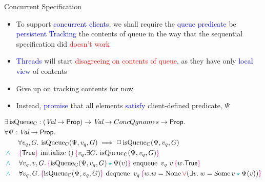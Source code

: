 \documentclass[9pt,xcolor={dvipsnames}]{beamer}
\newcommand{\initialise}{\operatorname{initialize}}
\newcommand{\enqueue}{\operatorname{enqueue}}
\newcommand{\dequeue}{\operatorname{dequeue}}
\newcommand{\isqueueconc}{\operatorname{isQueue_{C}}}
\newcommand{\ConcQgnames}{ConcQgnames}
\newcommand{\vq}{v_q}
\newcommand{\nodeval}{\valB}
\newcommand{\absvalue}{\val}
\newcommand{\Qg}{G}
\newcommand{\concspecinitHTGen}[3]{\hoare{\TRUE}{\initialise \ \TT}{#2 . \Exists #3. \isqueueconc(#1, #2, #3)}}
\newcommand{\concspecinitGen}[3]{\concspecinitHTGen{#1}{#2}{#3}}
\newcommand{\concspecinit}[1]{\concspecinitGen{#1}{\vq}{\Qg}}
\newcommand{\concspecenqHT}[4]{\hoare{\isqueueconc(#1, #2, #4) \star{} #1(#3)}{\enqueue \ #2 \ #3}{\valB . \TRUE}}
\newcommand{\concspecenqGen}[4]{\All #2, #3, #4. \concspecenqHT{#1}{#2}{#3}{#4}}
\newcommand{\concspecenq}[1]{\concspecenqGen{#1}{\vq}{\absvalue}{\Qg}}
\newcommand{\concspecdeqHT}[3]{\hoare{\isqueueconc(#1, #2, #3)}{\dequeue \ #2}{\nodeval . \nodeval = \None \lor{} (\Exists \absvalue . \nodeval = \Some \absvalue \star{} #1(\absvalue))}}
\newcommand{\concspecdeqGen}[3]{\All #2, #3. \concspecdeqHT{#1}{#2}{#3}}
\newcommand{\concspecdeq}[1]{\concspecdeqGen{#1}{\vq}{\Qg}}
\let\oldlor\lor
\renewcommand{\lor}{\begingroup \color{red} \oldlor \endgroup}
\let\oldland\land
\renewcommand{\land}{\begingroup \color{Emerald} \oldland \endgroup}
\let\oldstar\star
\renewcommand{\star}{\begingroup \color{Emerald} \oldstar \endgroup}
\begin{document}
\begin{frame}{Concurrent Specification}
  \begin{itemize}
    \item To support \textcolor{blue}{concurrent clients}, we shall require the \textcolor{blue}{queue predicate} be \textcolor{blue}{persistent}
    \textcolor{blue}{Tracking} the contents of queue in the way that the sequential specification did \textcolor{red}{doesn't work}
    \item \textcolor{blue}{Threads} will start \textcolor{red}{disagreeing on contents of queue}, as they have only \textcolor{blue}{local view} of contents
    \item Give up on tracking contents for now
    \item Instead, \textcolor{blue}{promise} that all elements \textcolor{blue}{satisfy} client-defined \textcolor{RubineRed}{predicate}, $\Psi$
  \end{itemize}
  \begin{definition}\label{QueueSpecs:spec:conc}
    \setlength\abovedisplayskip{-8pt}
    \setlength\belowdisplayskip{2pt}
    \fontsize{8pt}{10}\selectfont
    \begin{align*}
      &\Exists \isqueueconc : (\Val \to \Prop) \to \Val \to \ConcQgnames \to \Prop.\\
      &\All \Psi : \Val \to \Prop.\\
      &\quad\quad \All \vq, \Qg . \isqueueconc(\Psi, \vq, \Qg) \implies \persistently \isqueueconc(\Psi, \vq, \Qg)\\
      &\land{}\quad\concspecinit{\Psi}\\
      &\land{}\quad\concspecenq{\Psi}\\
      &\land{}\quad\concspecdeq{\Psi}
    \end{align*}
  \end{definition}
\end{frame}
\end{document}

